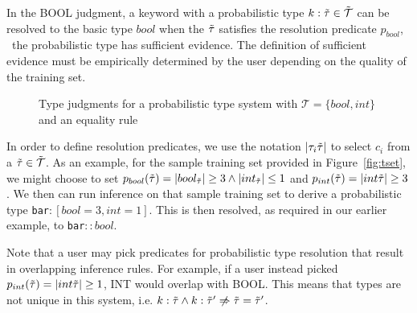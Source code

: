 In the {\scriptsize BOOL} judgment, a keyword with a probabilistic type $k : \tilde{\tau} \in \tilde{\mathcal{T}}$ can be resolved to the basic type $bool$ when the $\tilde{\tau}$ satisfies the resolution predicate $p_{bool}$, \ie\ the probabilistic type has sufficient evidence.
The definition of sufficient evidence must be empirically determined by the user depending on the quality of the training set.

{
\setlength{\abovecaptionskip}{-.05pt}
\setlength{\belowcaptionskip}{-15pt}
\begin{figure}
\caption{Type judgments for a probabilistic type system with $\mathcal{T} = \{bool,int\}$ and an equality rule}
\label{fig:ptypes}
\end{figure}
}

In order to define resolution predicates, we use the notation $|\tau_i\tilde{\tau}|$ to select $c_i$ from a $\tilde{\tau} \in \tilde{\mathcal{T}}$.
As an example, for the sample training set provided in Figure~\ref{fig:tset}, we might choose to set $p_{bool}(\tilde{\tau})= |bool_{\tilde{\tau}}| \geq 3 \land |int_{\tilde{\tau}}| \leq 1$ and $p_{int}(\tilde{\tau})= |int\tilde{\tau}| \geq 3$.
We then can run inference on that sample training set to derive a probabilistic type \texttt{bar}$:[bool=3,int=1]$.
This is then resolved, as required in our earlier example, to \texttt{bar}$::bool$.
 
Note that a user may pick predicates for probabilistic type resolution that result in overlapping inference rules.
For example, if a user instead picked $p_{int}(\tilde{\tau})= |int\tilde{\tau}| \geq 1$, {\scriptsize INT} would overlap with {\scriptsize BOOL}.
This means that types are not unique in this system, i.e. $k:\ptype \land k:\ptype' \centernot\implies \ptype = \ptype'$.

